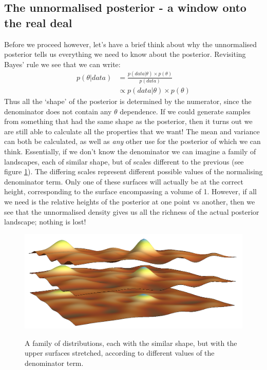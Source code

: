\documentclass[11pt,fullpage]{book}
\begin{document}
\subsection{The unnormalised posterior - a window onto the real deal}\label{sec:MCMC_unnormalisedPosteriorSampling}
Before we proceed however, let's have a brief think about why the unnormalised posterior tells us everything we need to know about the posterior. Revisiting Bayes' rule we see that we can write:
%
\begin{align}
p(\theta|data) &= \frac{p(data|\theta)\times p(\theta)}{p(data)}\\
&\propto p(data|\theta)\times p(\theta)
\end{align}
%
Thus all the `shape' of the posterior is determined by the numerator, since the denominator does not contain any $\theta$ dependence. If we could generate samples from something that had the same shape as the posterior, then it turns out we are still able to calculate all the properties that we want! The mean and variance can both be calculated, as well as \textit{any} other use for the posterior of which we can think. Essentially, if we don't know the denominator we can imagine a family of landscapes, each of similar shape, but of scales different to the previous (see figure \ref{fig:MCMC_familityOfDistributionsShape}). The differing scales represent different possible values of the normalising denominator term. Only one of these surfaces will actually be at the correct height, corresponding to the surface encompassing a volume of 1. However, if all we need is the relative heights of the posterior at one point vs another, then we see that the unnormalised density gives us all the richness of the actual posterior landscape; nothing is lost!

\begin{figure}
\centering
\scalebox{0.3} 
{\includegraphics{MCMC_familityOfDistributionsShape.png}}
\caption{A family of distributions, each with the similar shape, but with the upper surfaces stretched, according to different values of the denominator term.}\label{fig:MCMC_familityOfDistributionsShape}
\end{figure}
\end{document}
